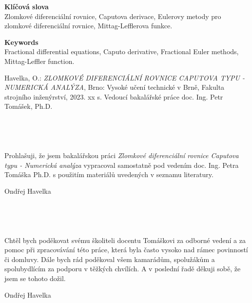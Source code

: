 \documentclass[a4paper,12pt,twoside]{article}
\theoremstyle{definition}
\theoremstyle{remark}
\numberwithin{equation}{section}
\numberwithin{table}{section}
\numberwithin{figure}{section}
\begin{document}
\vspace{1cm}
\noindent
{\bf Klíčová slova}\\
Zlomkové diferenciální rovnice, Caputova derivace, Eulerovy metody pro zlomkové diferenciální rovnice, Mittag-Lefflerova funkce.

\vspace{1cm}
\noindent
{\bf Keywords}\\
Fractional differential equations, Caputo derivative, Fractional Euler methods, Mittag-Leffler function.

\vfill\noindent
Havelka, O.: {\it ZLOMKOVÉ DIFERENCIÁLNÍ ROVNICE CAPUTOVA TYPU - NUMERICKÁ ANALÝZA}, Brno: Vysoké učení technické v Brně, Fakulta strojního inženýrství, 2023. xx s. Vedoucí bakalářské práce doc. Ing. Petr Tomášek, Ph.D.

\newpage
\thispagestyle{empty}
\

\newpage
\thispagestyle{empty}

\

\vspace{15cm}\noindent Prohlašuji, že jsem bakalářskou práci {\it
Zlomkové diferenciální rovnice Caputova typu - Numerická analýza} vypracoval samostatně pod
vedením doc. Ing. Petra Tomáška Ph.D. s použitím materiálů uvedených
v seznamu literatury.

\vspace{1cm}
\hfill{Ondřej Havelka}

\newpage
\thispagestyle{empty}
\

\newpage
\thispagestyle{empty}

\

\vspace{18cm}\noindent Chtěl bych poděkovat svému školiteli docentu Tomáškovi za odborné vedení a za pomoc při zpracovávání této práce, která byla často vysoko nad rámec povinností či domluvy. Dále bych rád poděkoval všem kamarádům, spolužákům a spolubydlícím za podporu v těžkých chvílích. A v poslední řadě děkuji sobě, že jsem se tohoto dožil.

\vspace{1cm}
\hfill{Ondřej Havelka}

\newpage
\thispagestyle{empty}
\
\end{document}
